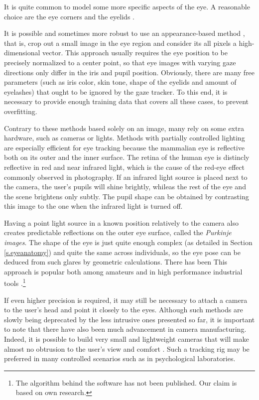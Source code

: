 It is quite common to model some more specific aspects of the eye.
A reasonable choice are the eye corners \cite{zhu12} and the eyelids \cite{yuille92}.

It is possible and sometimes more robust to use an appearance-based method \cite{tan02}, that is, crop out a small image in the eye region and consider its all pixels a high-dimensional vector.
This approach usually requires the eye position to be precisely normalized to a center point, so that eye images with varying gaze directions only differ in the iris and pupil position.
Obviously, there are many free parameters (such as iris color, skin tone, shape of the eyelids and amount of eyelashes) that ought to be ignored by the gaze tracker.
To this end, it is necessary to provide enough training data that covers all these cases, to prevent overfitting.

Contrary to these methods based solely on an image, many rely on some extra hardware, such as cameras or lights.
Methods with partially controlled lighting are especially efficient for eye tracking because the mammalian eye is reflective both on its outer and the inner surface.
The retina of the human eye is distincly reflective in red and near infrared light, which is the cause of the red-eye effect commonly observed in photography.
If an infrared light source is placed next to the camera, the user's pupils will shine brightly, whileas the rest of the eye and the scene brightens only subtly.
The pupil shape can be obtained by contrasting this image to the one when the infrared light is turned off.

Having a point light source in a known position relatively to the camera also creates predictable reflections on the outer eye surface, called the \textit{Purkinje images}.
The shape of the eye is just quite enough complex (as detailed in Section \ref{s.eyeanatomy}) and quite the same across individuals, so the eye pose can be deduced from such glares by geometric calculations.
There has been \todo{\dots}\cite{villanueva08}
This approach is popular both among amateurs \cite{yucel09,wolski16} and in high performance industrial tools \cite{p:tobii}.\footnote{
The algorithm behind the software \cite{p:tobii} has not been published.
Our claim is based on own research.
}

If even higher precision is required, it may still be necessary to attach a camera to the user's head and point it closely to the eyes.
Although such methods are slowly being deprecated by the less intrusive ones presented so far, it is important to note that there have also been much advancement in camera manufacturing.
Indeed, it is possible to build very small and lightweight cameras that will make almost no obtrusion to the user's view and comfort \cite{p:pupil}.
Such a tracking rig may be preferred in many controlled scenarios such as in psychological laboratories.

